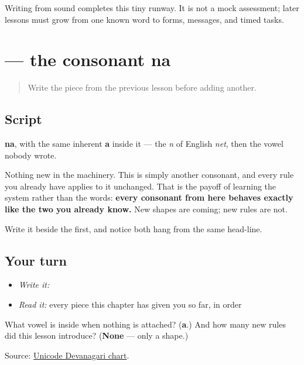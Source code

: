 \begin{tcolorbox}[breakable,colback=teal!4,colframe=teal!35!black,title={Before you move on}]
Writing from sound completes this tiny runway. It is not a mock assessment; later lessons must grow from one known word to forms, messages, and timed tasks.
\end{tcolorbox}
\section[na]{ — the consonant na}

\label{lesson:MR-W01-na}



\begin{quote}
Write the piece from the previous lesson before adding another.
\end{quote}

\subsection*{Script}
\begin{quote}
\end{quote}

\textbf{na}, with the same inherent \textbf{a} inside it — the \emph{n} of English \emph{net}, then the vowel nobody wrote.

Nothing new in the machinery. This is simply another consonant, and every rule you already have applies to it unchanged. That is the payoff of learning the system rather than the words: \textbf{every consonant from here behaves exactly like the two you already know.} New shapes are coming; new rules are not.

Write it beside the first, and notice both hang from the same head-line.

\subsection*{Your turn}
\begin{itemize}
\raggedright
  \item \emph{Write it:} 
  \item \emph{Read it:} every piece this chapter has given you so far, in order
\end{itemize}

\begin{tcolorbox}[breakable,colback=teal!4,colframe=teal!35!black,title={Before you move on}]
What vowel is inside \textbf{} when nothing is attached? (\textbf{a}.) And how many new rules did this lesson introduce? (\textbf{None} — only a shape.)

Source: \href{https://www.unicode.org/charts/PDF/U0900.pdf}{Unicode Devanagari chart}.
\end{tcolorbox}
